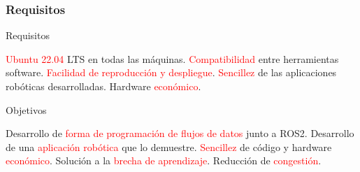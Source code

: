 \documentclass{beamer}
\begin{document}
\begin{frame}
\frametitle{Requisitos}
\begin{block}{Requisitos}
\begin{outline}
\1 \textcolor{red}{Ubuntu 22.04} LTS en todas las máquinas.
\1 \textcolor{red}{Compatibilidad} entre herramientas software.
\1 \textcolor{red}{Facilidad de reproducción y despliegue}.
\1 \textcolor{red}{Sencillez} de las aplicaciones robóticas desarrolladas.
\1 Hardware \textcolor{red}{económico}.
\end{outline}
\end{block}
\begin{block}{Objetivos}
\begin{outline}
\1 Desarrollo de \textcolor{red}{forma de programación de flujos de datos} junto a ROS2.
\1 Desarrollo de una \textcolor{red}{aplicación robótica} que lo demuestre.
\1 \textcolor{red}{Sencillez} de código y hardware \textcolor{red}{económico}.
\1 Solución a la \textcolor{red}{brecha de aprendizaje}.
\1 Reducción de \textcolor{red}{congestión}.
\end{outline}
\end{block}
\end{frame}
\end{document}

